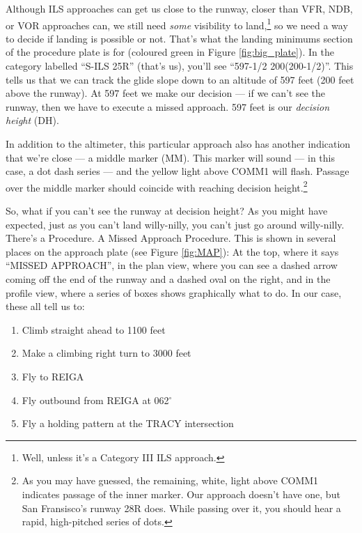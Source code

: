 Although ILS approaches can get us close to the runway, closer than
VFR, NDB, or VOR approaches can, we still need \emph{some} visibility
to land,\footnote{Well, unless it's a Category III ILS approach.} so
we need a way to decide if landing is possible or not.  That's what
the landing minimums section of the procedure plate is for (coloured
green in Figure \ref{fig:big_plate}).  In the category labelled
``S-ILS 25R'' (that's us), you'll see ``597-1/2 200(200-1/2)''.  This
tells us that we can track the glide slope down to an altitude of 597
feet (200 feet above the runway).  At 597 feet we make our decision
--- if we can't see the runway, then we have to execute a missed
approach.  597 feet is our \emph{decision height} (DH).

In addition to the altimeter, this particular approach also has
another indication that we're close --- a middle marker (MM).  This
marker will sound --- in this case, a dot dash series --- and the
yellow light above COMM1 will flash.  Passage over the middle marker
should coincide with reaching decision height.\footnote{As you may
  have guessed, the remaining, white, light above COMM1 indicates
  passage of the inner marker.  Our approach doesn't have one, but San
  Fransisco's runway 28R does.  While passing over it, you should hear
  a rapid, high-pitched series of dots.}

So, what if you can't see the runway at decision height?  As you might
have expected, just as you can't land willy-nilly, you can't just go
around willy-nilly.  There's a Procedure.  A Missed Approach
Procedure.  This is shown in several places on the approach plate (see
Figure \ref{fig:MAP}): At the top, where it says ``MISSED APPROACH'',
in the plan view, where you can see a dashed arrow coming off the end
of the runway and a dashed oval on the right, and in the profile view,
where a series of boxes shows graphically what to do.  In our case,
these all tell us to:

\begin{enumerate}
\item Climb straight ahead to 1100 feet
\item Make a climbing right turn to 3000 feet
\item Fly to REIGA
\item Fly outbound from REIGA at 062$^\circ$
\item Fly a holding pattern at the TRACY intersection
\end{enumerate}

